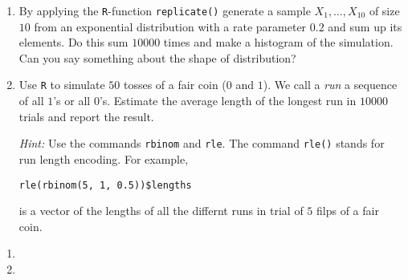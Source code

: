 
\begin{exercise}[Simulations]

\phantom{}

\begin{enumerate}[label = (\alph*)]

    \item By applying the \texttt R-function \texttt{replicate()} generate a sample $X_1, \dots, X_{10}$ of size $10$ from an exponential distribution with a rate parameter $0.2$ and sum up its elements.
    Do this sum $10 000$ times and make a histogram of the simulation.
    Can you say something about the shape of distribution?

    \item Use \texttt R to simulate $50$ tosses of a fair coin ($0$ and $1$).
    We call a \textit{run} a sequence of all $1$'s or all $0$'s.
    Estimate the average length of the longest run in $10 000$ trials and report the result.

    \textit{Hint:}
    Use the commands \texttt{rbinom} and \texttt{rle}.
    The command \texttt{rle()} stands for run length encoding.
    For example,

    \verb|rle(rbinom(5, 1, 0.5))$lengths|

    is a vector of the lengths of all the differnt runs in trial of $5$ filps of a fair coin.

\end{enumerate}

\end{exercise}


\begin{solution}

\phantom{}

\begin{enumerate}[label = (\alph*)]

    \item \phantom{}
    

    \item \phantom{}
    

\end{enumerate}

\end{solution}

